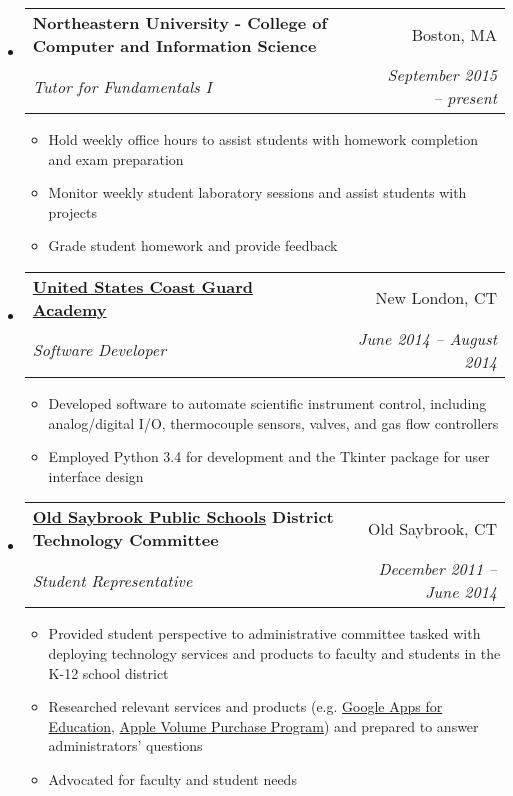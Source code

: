 \documentclass[letterpaper,10.6pt]{article}
\makeatletter
\newcommand{\resitem}[1]{\item #1 \vspace{-2pt}}
\newcommand{\ressubheading}[4]{
\begin{tabular*}{6.8in}{l@{\extracolsep{\fill}}r}
		\textbf{#1} & #2 \\
		\emph{#3} & \emph{#4} \\
\end{tabular*}\vspace{-6pt}}
\makeatother
\begin{document}
	\begin{itemize}[leftmargin=*]
		\item[]
			\ressubheading{Northeastern University - College of Computer and Information Science}{Boston, MA}{Tutor for Fundamentals I}{September 2015 -- present}
			{\footnotesize
				\begin{itemize}
					\resitem{Hold weekly office hours to assist students with homework completion and exam preparation}
					\resitem{Monitor weekly student laboratory sessions and assist students with projects}
					\resitem{Grade student homework and provide feedback}
				\end{itemize}}
		\item[] 
			\ressubheading{\href{http://www.uscga.edu}{United States Coast Guard Academy}}{New London, CT}
				{Software Developer}{June 2014 -- August 2014}
				{ \footnotesize
				\begin{itemize}
					\resitem{Developed software to automate scientific instrument control, including analog/digital I/O, thermocouple sensors, valves, and gas flow controllers}
					\resitem{Employed Python 3.4 for development and the Tkinter package for user interface design}
				\end{itemize}
				}
		\item[]
			\ressubheading{\href{http://www.oldsaybrookschools.org}{Old Saybrook Public Schools} District Technology Committee}{Old Saybrook, CT}
				{Student Representative}{December 2011 --  June 2014}
				{\footnotesize
				\begin{itemize}
					\resitem{Provided student perspective to administrative committee tasked with deploying technology services and products to faculty and students in the K-12 school district}
					\resitem{Researched relevant services and products (e.g. \href{https://www.google.com/work/apps/education/}{Google Apps for Education}, \href{http://www.apple.com/education/it/vpp/}{Apple Volume Purchase Program}) and prepared to answer administrators' questions}
					\resitem{Advocated for faculty and student needs}
				\end{itemize}}

\end{itemize}
\end{document}
